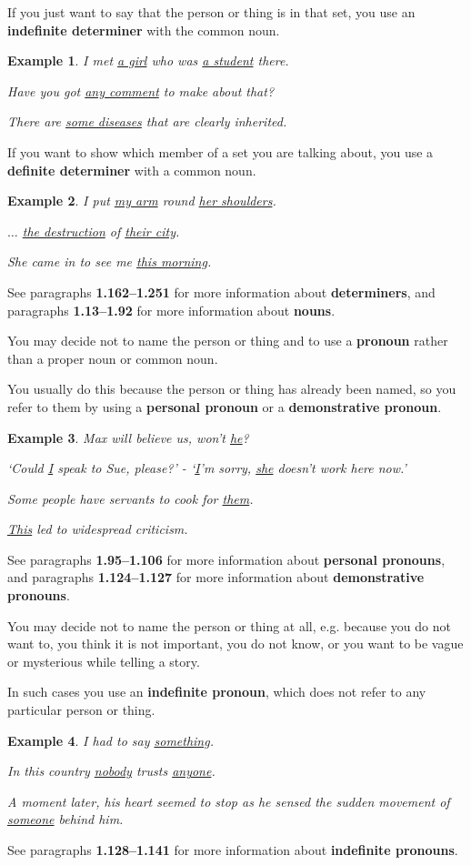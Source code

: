 \documentclass[oneside]{book}
\numberwithin{equation}{section}
\newtheorem{example}{Example}[section]
\begin{document}
%
If you just want to say that the person or thing is in that set, you use an \textbf{indefinite determiner} with the common noun.
\begin{example}
    I met \underline{a girl} who was \underline{a student} there.
    
    Have you got \underline{any comment} to make about that?
    
    There are \underline{some diseases} that are clearly inherited.
\end{example}
If you want to show which member of a set you are talking about, you use a \textbf{definite determiner} with a common noun.
\begin{example}
    I put \underline{my arm} round \underline{her shoulders}.
    
    $\ldots$ \underline{the destruction} of \underline{their city}.
    
    She came in to see me \underline{this morning}.
\end{example}
See paragraphs \textbf{1.162--1.251} for more information about \textbf{determiners}, and paragraphs \textbf{1.13--1.92} for more information about \textbf{nouns}.

%
\noindent{} You may decide not to name the person or thing and to use a \textbf{pronoun} rather than a proper noun or common noun.

%
You usually do this because the person or thing has already been named, so you refer to them by using a \textbf{personal pronoun} or a \textbf{demonstrative pronoun}.
\begin{example}
    Max will believe us, won't \underline{he}?
    
    `Could \underline{I} speak to Sue, please?' - `\underline{I}'m sorry, \underline{she} doesn't work here now.'
    
    Some people have servants to cook for \underline{them}.
    
    \underline{This} led to widespread criticism.
\end{example}
See paragraphs \textbf{1.95--1.106} for more information about \textbf{personal pronouns}, and paragraphs \textbf{1.124--1.127} for more information about \textbf{demonstrative pronouns}.

%
\noindent{} You may decide not to name the person or thing at all, e.g. because you do not want to, you think it is not important, you do not know, or you want to be vague or mysterious while telling a story.

In such cases you use an \textbf{indefinite pronoun}, which does not refer to any particular person or thing.
\begin{example}
    I had to say \underline{something}.
    
    In this country \underline{nobody} trusts \underline{anyone}.
    
    A moment later, his heart seemed to stop as he sensed the sudden movement of \underline{someone} behind him.
\end{example}
See paragraphs \textbf{1.128--1.141} for more information about \textbf{indefinite pronouns}.
\end{document}
